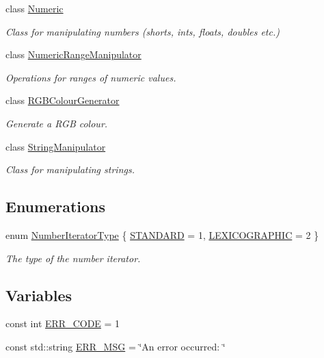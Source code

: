 \begin{DoxyCompactItemize}
class \hyperlink{classmultiscale_1_1Numeric}{Numeric}
\begin{DoxyCompactList}\small\item\em Class for manipulating numbers (shorts, ints, floats, doubles etc.) \end{DoxyCompactList}\item 
class \hyperlink{classmultiscale_1_1NumericRangeManipulator}{Numeric\-Range\-Manipulator}
\begin{DoxyCompactList}\small\item\em Operations for ranges of numeric values. \end{DoxyCompactList}\item 
class \hyperlink{classmultiscale_1_1RGBColourGenerator}{R\-G\-B\-Colour\-Generator}
\begin{DoxyCompactList}\small\item\em Generate a R\-G\-B colour. \end{DoxyCompactList}\item 
class \hyperlink{classmultiscale_1_1StringManipulator}{String\-Manipulator}
\begin{DoxyCompactList}\small\item\em Class for manipulating strings. \end{DoxyCompactList}\end{DoxyCompactItemize}
\subsection*{Enumerations}
\begin{DoxyCompactItemize}
\item 
enum \hyperlink{namespacemultiscale_a6ef911f4d48a4bf5e657c237ec169ff5}{Number\-Iterator\-Type} \{ \hyperlink{namespacemultiscale_a6ef911f4d48a4bf5e657c237ec169ff5aa048887eb0360a4b70dff5452133f42e}{S\-T\-A\-N\-D\-A\-R\-D} = 1, 
\hyperlink{namespacemultiscale_a6ef911f4d48a4bf5e657c237ec169ff5a2cba3a0174cc5c1d555ee13dcf6cda15}{L\-E\-X\-I\-C\-O\-G\-R\-A\-P\-H\-I\-C} = 2
 \}
\begin{DoxyCompactList}\small\item\em The type of the number iterator. \end{DoxyCompactList}\end{DoxyCompactItemize}
\subsection*{Variables}
\begin{DoxyCompactItemize}
\item 
const int \hyperlink{namespacemultiscale_a4ee40795105048ee371efeeb7962ecf6}{E\-R\-R\-\_\-\-C\-O\-D\-E} = 1
\item 
const std\-::string \hyperlink{namespacemultiscale_a06490e4e11ef359aa0260f96579ce584}{E\-R\-R\-\_\-\-M\-S\-G} = \char`\"{}An error occurred\-: \char`\"{}
\end{DoxyCompactItemize}


